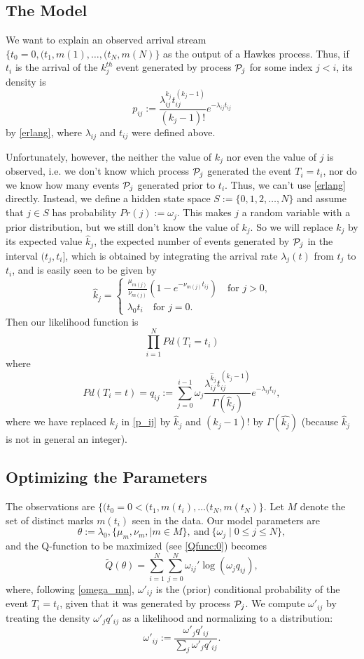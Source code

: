 \documentclass[12pt,leqno]{article}
\begin{document}
\subsection{The Model}
We want to explain an observed arrival stream $\{t_0 = 0, (t_1,m(1),\dots,(t_N,m(N)\}$ as the output
of a Hawkes process.
Thus, if $t_i$ is the arrival of the $k_j^{th}$ event generated by process ${\cal{P}}_j$ for some index $j < i$,
its density is
\begin{equation}\label{p_ij}
  p_{ij} :=  \frac{\lambda_{ij}^{k_j}t_{ij}^{(k_j-1)}}{(k_j-1)!}e^{-\lambda_{ij}t_{ij}}
\end{equation}
by \eqref{erlang}, where $\lambda_{ij}$ and $t_{ij}$ were defined above.

Unfortunately, however, the neither the value of $k_j$ nor even the value of $j$ is  observed, i.e. we don't know
which process ${\cal{P}}_j$ generated the event $T_i = t_i$, nor do we know how many events ${\cal{P}}_j$
generated prior to $t_i$.  Thus, we can't use \eqref{erlang} directly. Instead,
we define a hidden state space $S := \{0,1,2,\dots,N\}$ and assume that $j\in{S}$ has probability $Pr(j) := \omega_j$.
This makes $j$ a random variable with a prior distribution, but we still don't know the value of $k_j$.  So we
will replace $k_j$ by its expected value $\hat{k}_j$, the expected number of events generated by ${\cal{P}}_j$
in the interval $(t_j,t_i]$, which is  obtained by integrating the arrival rate $\lambda_j(t)$ from $t_j$ to $t_i$,
and is easily seen to be given by
$$
\hat{k}_j =
\begin{cases}
  \frac{\mu_{m(j)}}{\nu_{m(j)}}(1-e^{-\nu_{m(j)}t_{ij}})\quad\text{for $j > 0$,} \\
  \lambda_0t_i\quad\text{for $j = 0$}.
\end{cases}
$$
Then our likelihood function is
$$
\prod_{i=1}^NPd(T_i = t_i)
$$
where 
\begin{equation}\label{q_ij}
  Pd(T_i = t) = q_{ij} := \sum_{j = 0}^{i-1}\omega_j\frac{\lambda_{ij}^{\hat{k}_j}t_{ij}^{(\hat{k}_j-1)}}{\Gamma(\hat{k}_j)}
    e^{-\lambda_{ij}t_{ij}},
\end{equation}
where we have replaced $k_j$ in \eqref{p_ij} by $\hat{k}_j$ and $(k_j-1)!$ by $\Gamma(\hat{k_j})$
(because $\hat{k}_j$ is not in general an integer).

\subsection{Optimizing the Parameters}
The observations are $\{(t_0 = 0 < (t_1,m(t_i),\dots(t_N,m(t_N)\}$.  Let $M$ denote the set of distinct marks $m(t_i)$
seen in the data.  Our model parameters are
$$
\theta := \lambda_0, \{\mu_m, \nu_m, \mid m \in M\},~\text{and}~ \{\omega_j\mid 0\le j\le N\},
$$
and the Q-function to be maximized (see \eqref{Qfunc:0}) becomes
$$
\tilde{Q}(\theta) = \sum_{i=1}^N\sum_{j=0}^N\omega_{ij}'\log(\omega_jq_{ij}),
$$
where, following \eqref{omega_mn}, $\omega'_{ij}$ is the (prior) conditional
probability of the event $T_i=t_i$,
given that it was generated by process ${\cal{P}}_j$.  We compute $\omega'_{ij}$ by
treating the density $\omega'_jq'_{ij}$ as a likelihood and normalizing to a distribution:
$$
\omega'_{ij} := \frac{\omega'_jq'_{ij}}{\sum_j\omega'_jq'_{ij}}.
$$
\end{document}
